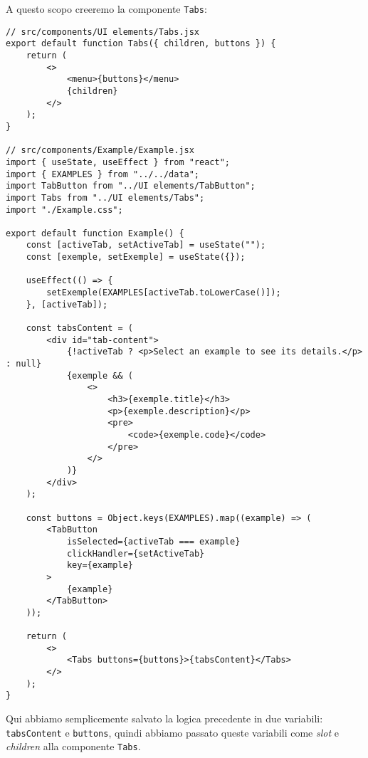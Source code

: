 \documentclass[12pt]{article}
\begin{document}
\pagebreak
A questo scopo creeremo la componente \texttt{Tabs}:
\begin{verbatim}
// src/components/UI elements/Tabs.jsx
export default function Tabs({ children, buttons }) {
    return (
        <>
            <menu>{buttons}</menu>
            {children}
        </>
    );
}

// src/components/Example/Example.jsx
import { useState, useEffect } from "react";
import { EXAMPLES } from "../../data";
import TabButton from "../UI elements/TabButton";
import Tabs from "../UI elements/Tabs";
import "./Example.css";

export default function Example() {
    const [activeTab, setActiveTab] = useState("");
    const [exemple, setExemple] = useState({});

    useEffect(() => {
        setExemple(EXAMPLES[activeTab.toLowerCase()]);
    }, [activeTab]);

    const tabsContent = (
        <div id="tab-content">
            {!activeTab ? <p>Select an example to see its details.</p> : null}
            {exemple && (
                <>
                    <h3>{exemple.title}</h3>
                    <p>{exemple.description}</p>
                    <pre>
                        <code>{exemple.code}</code>
                    </pre>
                </>
            )}
        </div>
    );

    const buttons = Object.keys(EXAMPLES).map((example) => (
        <TabButton
            isSelected={activeTab === example}
            clickHandler={setActiveTab}
            key={example}
        >
            {example}
        </TabButton>
    ));

    return (
        <>
            <Tabs buttons={buttons}>{tabsContent}</Tabs>
        </>
    );
}
\end{verbatim}

\pagebreak
Qui abbiamo semplicemente salvato la logica precedente in due variabili:
\texttt{tabsContent} e \texttt{buttons}, quindi abbiamo passato queste
variabili come {\it slot} e {\it children} alla componente \texttt{Tabs}.
\end{document}
